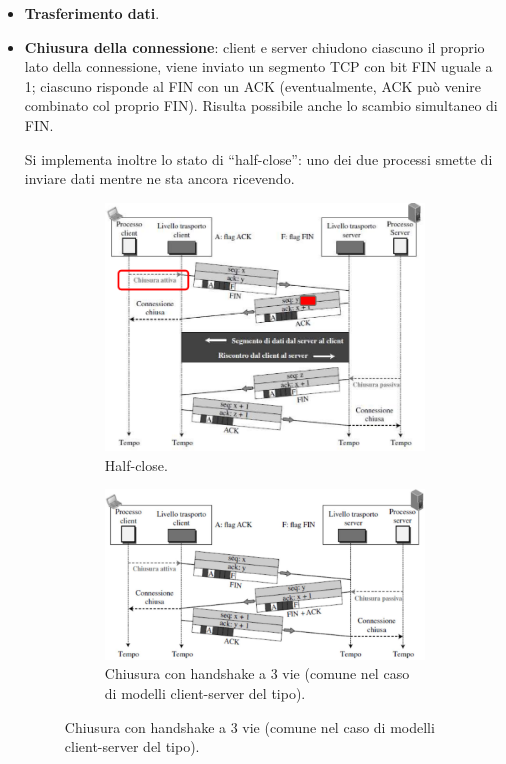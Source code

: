 \documentclass[11pt, italian, openany]{book}
\begin{document}
\begin{sloppypar}
\begin{itemize}[topsep=0pt]
\begin{itemize}
		\item \textbf{Trasferimento dati}.
		\item \textbf{Chiusura della connessione}: client e server chiudono ciascuno il proprio lato della connessione, viene inviato un segmento TCP con
		bit FIN uguale a 1; ciascuno risponde al FIN con un ACK (eventualmente, ACK pu\`o venire combinato col proprio FIN). Risulta possibile anche lo
		scambio simultaneo di FIN.

		Si implementa inoltre lo stato di ``half-close'': uno dei due processi smette di inviare dati mentre ne sta ancora ricevendo.

		\begin{figure}[h!]
			\begin{subfigure}{0.49 \linewidth} \centering
				\includegraphics[scale=0.215]{images/tcp-half-close.png}
				\caption{Half-close.}
			\end{subfigure}
			\begin{subfigure}{0.49 \linewidth} \centering
				\includegraphics[scale=0.215]{images/tcp-chiusura-3way-handshake.png}
				\caption{Chiusura con handshake a 3 vie (comune nel caso di modelli client-server del tipo).}
			\end{subfigure}
		\end{figure}
		\pagebreak


\end{itemize}
\end{itemize}
\end{sloppypar}
\end{document}
